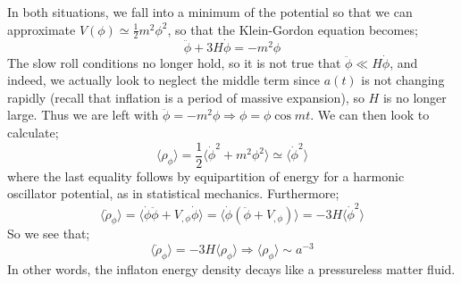 \paraskip
In both situations, we fall into a minimum of the potential so that we can approximate $V(\phi) \simeq \tfrac{1}{2}m^2 \phi^2$, so that the Klein-Gordon equation becomes;
\begin{equation*}
\ddot{\phi} + 3H \dot{\phi} = -m^2 \phi
\end{equation*}
The slow roll conditions no longer hold, so it is not true that $\ddot{\phi} \ll H \dot{\phi}$, and indeed, we actually look to neglect the middle term since $a(t)$ is not changing rapidly (recall that inflation is a period of massive expansion), so $H$ is no longer large. Thus we are left with $\ddot{\phi} = -m^2 \phi \Rightarrow \phi = \phi \cos mt$. We can then look to calculate;
\begin{equation*}
\langle \rho_\phi \rangle = \frac{1}{2}\langle \dot{\phi}^2 + m^2 \phi^2 \rangle \simeq \langle \dot{\phi}^2 \rangle
\end{equation*}
where the last equality follows by equipartition of energy for a harmonic oscillator potential, as in statistical mechanics. Furthermore;
\begin{equation*}
\langle \dot{\rho}_\phi \rangle = \langle \dot{\phi}\ddot{\phi} + V_{, \phi}\dot{\phi} \rangle = \langle \dot{\phi}(\ddot{\phi} + V_{, \phi})\rangle = -3H \langle \dot{\phi}^2 \rangle
\end{equation*}
So we see that;
\begin{equation*}
\langle \dot{\rho}_\phi \rangle = -3H \langle \rho_\phi \rangle \Rightarrow \langle \rho_\phi \rangle \sim a^{-3}
\end{equation*}
In other words, the inflaton energy density decays like a pressureless matter fluid. 

